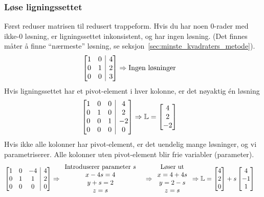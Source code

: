 \documentclass[12pt,a4paper,norsk]{article}
\makeatletter
\newcommand{\mat}[2]{\left[\begin{array}{@{}#1@{}}#2\end{array}\right]}
\makeatother
\begin{document}
\subsubsection{Løse ligningssettet}
Først reduser matrisen til redusert trappeform. Hvis du har noen 0-rader med
ikke-0 løsning, er ligningssettet inkonsistent, og har ingen løsning. (Det
finnes måter å finne ``nærmeste'' løsning, se seksjon~\ref{sec:minste_kvadraters_metode}).
\begin{align*}
  \mat{cc|c}{
  1 & 0 & 4 \\
  0 & 1 & 2 \\
  0 & 0 & 3
          }
          &\Rightarrow \text{Ingen løsninger}
\end{align*}
%
Hvis ligningssettet har et pivot-element i hver kolonne, er det
nøyaktig én løsning
\begin{align*}
  \mat{ccc|c}{
  1 & 0 & 0 & 4 \\
  0 & 1 & 0 & 2 \\
  0 & 0 & 1 & -2 \\
  0 & 0 & 0 & 0
            }
          &\Rightarrow \mathbb{L} = \mat{c}{4 \\ 2 \\ -2}
\end{align*}
%
Hvis ikke alle kolonner har pivot-element, er det uendelig mange løsninger, og
vi parametriserer. Alle kolonner uten pivot-element blir frie variabler
(parameter).
\begin{align*}
  \mat{ccc|c}{
  1 & 0 & -4 & 4 \\
  0 & 1 & 1 & 2 \\
  0 & 0 & 0 & 0 \\
            }
    &\Rightarrow
      \begin{array}{c}
        \text{Introduserer parameter $s$} \\
        x -4s = 4 \\
        y + s = 2 \\
        z = s
      \end{array}
  &\Rightarrow
      \begin{array}{c}
        \text{Løser ut} \\
        x = 4+4s \\
        y = 2-s \\
        z = s
      \end{array}
  &\Rightarrow\mathbb{L} = \mat{c}{4\\2\\0} + s\mat{c}{4\\-1\\1}
\end{align*}
\end{document}
